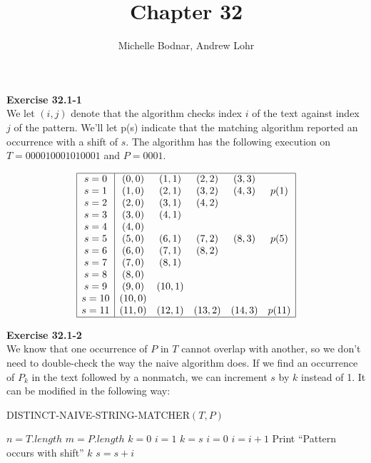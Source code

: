 \documentclass{article}
\title{Chapter 32}
\author{Michelle Bodnar, Andrew Lohr}
\begin{document}
\maketitle
\noindent\textbf{Exercise 32.1-1}\\

We let $(i,j)$ denote that the algorithm checks index $i$ of the text against index $j$ of the pattern. We'll let p(s) indicate that the matching algorithm reported an occurrence with a shift of $s$. The algorithm has the following execution on $T = 000010001010001$ and $P = 0001$.

\[
\begin{array}{|c|ccccc|}
\hline
s=0&(0,0)&(1,1)&(2,2)&(3,3)&\\
s=1&(1,0)&(2,1)&(3,2)&(4,3)&p(1)\\
s=2&(2,0)&(3,1)&(4,2)&&\\
s=3&(3,0)&(4,1)&&&\\
s=4&(4,0)&&&&\\
s=5&(5,0)&(6,1)&(7,2)&(8,3)&p(5)\\
s=6&(6,0)&(7,1)&(8,2)&&\\
s=7&(7,0)&(8,1)&&&\\
s=8&(8,0)&&&&\\
s=9&(9,0)&(10,1)&&&\\
s=10&(10,0)&&&&\\
s=11&(11,0)&(12,1)&(13,2)&(14,3)&p(11)\\
\hline
\end{array}
\]

\noindent\textbf{Exercise 32.1-2}\\

We know that one occurrence of $P$ in $T$ cannot overlap with another, so we don't need to double-check the way the naive algorithm does.  If we find an occurrence of $P_k$ in the text followed by a nonmatch, we can increment $s$ by $k$ instead of 1.  It can be modified in the following way:\\

\begin{algorithm}
\caption{DISTINCT-NAIVE-STRING-MATCHER$(T,P)$}
\begin{algorithmic}
\State $n = T.length$ 
\State $m = P.length$
\State $k=0$
	\State $i=1$
		\State $k = s$
		\State $i=0$
			$i = i+1$
				\State Print ``Pattern occurs with shift'' $k$
			\EndIf
		\EndWhile
	\EndIf
	\State $s = s+i$
\EndWhile
\end{algorithmic}
\end{algorithm}
\end{document}
